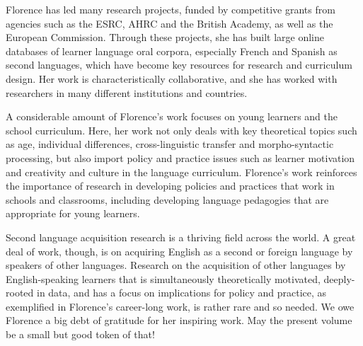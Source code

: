 \documentclass[output=paper]{langscibook}
\begin{document}
Florence has led many research projects, funded by competitive grants from agencies such as the ESRC, AHRC and the British Academy, as well as the European Commission. Through these projects, she has built large online databases of learner language oral corpora, especially French and Spanish as second languages, which have become key resources for research and curriculum design. Her work is characteristically collaborative, and she has worked with researchers in many different institutions and countries.

A considerable amount of Florence’s work focuses on young learners and the school curriculum. Here, her work not only deals with key theoretical topics such as age, individual differences, cross-linguistic transfer and morpho-syntactic processing, but also import policy and practice issues such as learner motivation and creativity and culture in the language curriculum. Florence’s work reinforces the importance of research in developing policies and practices that work in schools and classrooms, including developing language pedagogies that are appropriate for young learners.  

Second language acquisition research is a thriving field across the world. A great deal of work, though, is on acquiring English as a second or foreign language by speakers of other languages. Research on the acquisition of other languages by English-speaking learners that is simultaneously theoretically motivated, deeply-rooted in data, and has a focus on implications for policy and practice, as exemplified in Florence’s career-long work, is rather rare and so needed. We owe Florence a big debt of gratitude for her inspiring work. May the present volume be a small but good token of that! 

\printbibliography[heading=subbibliography,notkeyword=this]
\end{document}
